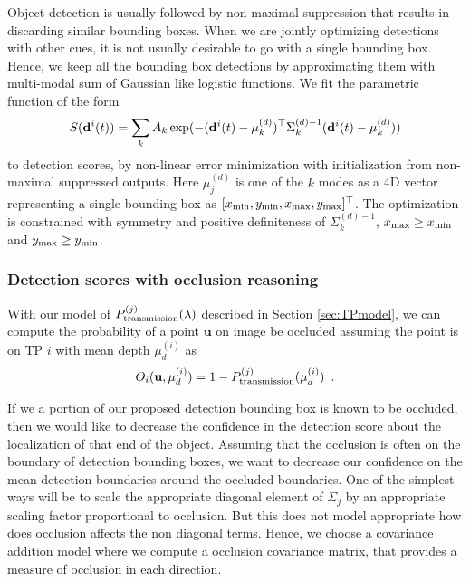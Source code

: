 Object detection is usually followed by non-maximal suppression that results in
discarding similar bounding boxes. When we are jointly optimizing detections
with other cues, it is not usually desirable to go with a single bounding box.
Hence, we keep all the bounding box detections by approximating them with
multi-modal sum of Gaussian like logistic functions. We fit the parametric function of the form 
%
\begin{align}
  S(\mathbf{d}^{i}(t)) = \sum_k A_k \exp(-(\mathbf{d}^{i}(t)-\mu^{(d)}_k)^\top \Sigma^{(d)-1}_k
  (\mathbf{d}^{i}(t)-\mu^{(d)}_k))
\end{align}
%
to detection scores, by non-linear error minimization with initialization from
non-maximal suppressed outputs. Here $\mu^{(d)}_j$ is one of the $k$ modes as a
4D vector representing a single bounding box as $[x_{\text{min}}, y_{\text{min}}, x_{\text{max}},
y_{\text{max}}]^\top$. The optimization is constrained with symmetry and positive
definiteness of $\Sigma^{(d)-1}_k$, $x_{\text{max}} \ge x_{\text{min}}$ and $y_{\text{max}} \ge y_{\text{min}}$.

\subsubsection{Detection scores with occlusion reasoning} 
With our model of $P^{(j)}_{\text{transmission}}(\lambda)$ described in Section \ref{sec:TPmodel}, we can
compute the probability of a point $\mathbf{u}$ on image be occluded assuming
the point is on TP $i$ with mean depth $\mu^{(i)}_d$ as
\begin{align}
  O_{i}(\mathbf{u}, \mu^{(i)}_d) = 1 - P^{(j)}_{\text{transmission}}(\mu^{(i)}_d) \enspace .
\end{align}

If we a portion of our proposed detection bounding box is known to be occluded,
then we would like to decrease the confidence in the detection score about the
localization of that end of the object. Assuming that the occlusion is often on
the boundary of detection bounding boxes, we want to decrease our confidence on
the mean detection boundaries around the occluded boundaries. 
One of the simplest ways will be to scale the appropriate diagonal element of
$\Sigma_j$ by an appropriate scaling factor proportional to occlusion. But this
does not model appropriate how does occlusion affects the non diagonal terms.
Hence, we choose a covariance addition model where we compute a occlusion
covariance matrix, that provides a measure of occlusion in each direction.


